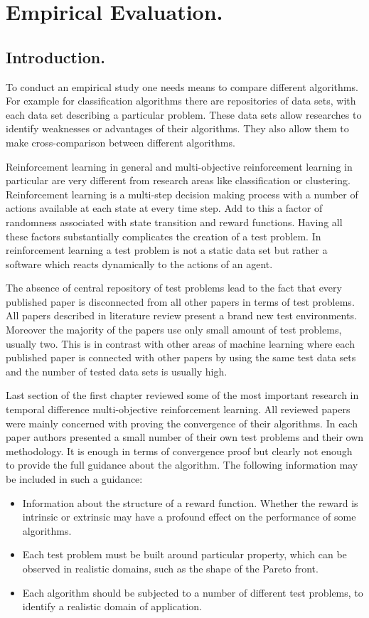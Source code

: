 \chapter{Empirical Evaluation.}

\section{Introduction.}

To conduct an empirical study one needs means to compare different algorithms. For example for classification algorithms there are repositories of data sets, with each data set describing a particular problem. These data sets allow researches to identify weaknesses or advantages of their algorithms. They also allow them to make cross-comparison between different algorithms.

Reinforcement learning in general and multi-objective reinforcement learning in particular are very different from research areas like classification or clustering. Reinforcement learning is a multi-step decision making process with a number of actions available at each state at every time step. Add to this a factor of randomness associated with state transition and reward functions. Having all these factors substantially complicates the creation of a test problem. In reinforcement learning a test problem is not a static data set but rather a software which reacts dynamically to the actions of an agent.

The absence of central repository of test problems lead to the fact that every published paper is disconnected from all other papers in terms of test problems. All papers described in literature review present a brand new test environments. Moreover the majority of the papers use only small amount of test problems, usually two. This is in contrast with other areas of machine learning where each published paper is connected with other papers by using the same test data sets and the number of tested data sets is usually high.

Last section of the first chapter reviewed some of the most important research in temporal difference multi-objective reinforcement learning. All reviewed papers were mainly concerned with proving the convergence of their algorithms. In each paper authors presented a small number of their own test problems and their own methodology. It is enough in terms of convergence proof but clearly not enough to provide the full guidance about the algorithm. The following information may be included in such a guidance:
\begin{itemize}
  \item Information about the structure of a reward function. Whether the reward is intrinsic or extrinsic may have a profound effect on the performance of some algorithms.
  \item Each test problem must be built around particular property, which can be observed in realistic domains, such as the shape of the Pareto front.
  \item Each algorithm should be subjected to a number of different test problems, to identify a realistic domain of application.
\end{itemize}

